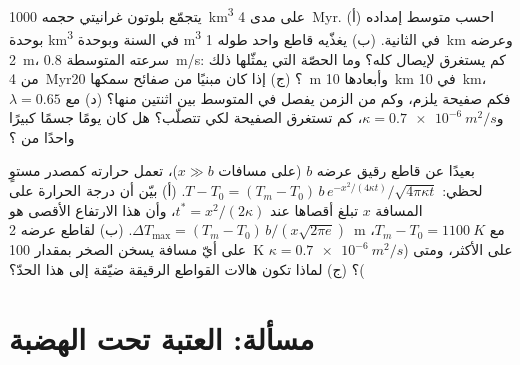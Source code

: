 \begin{exercise}[$\star\star\star$]\label{exo:b2:magma-emplacement:11}
يتجمّع بلوتون غرانيتي حجمه \qty{1000}{km^3} على مدى \qty{4}{Myr}. (أ) احسب
متوسط إمداده  بوحدة \unit{km^3} في السنة وبوحدة \unit{m^3} في الثانية. (ب)
يغذّيه قاطع واحد طوله \qty{1}{km} وعرضه \qty{2}{m}، سرعته المتوسطة
\qty{0.8}{m/s}: كم يستغرق  لإيصال 
كله؟ وما الحصّة التي يمثّلها ذلك من \qty{4}{Myr}؟ (ج) إذا كان  مبنيًا من
صفائح سمكها \qty{20}{m} وأبعادها \qty{10}{km} في \qty{10}{km}، فكم صفيحة
يلزم، وكم من الزمن يفصل في المتوسط بين اثنتين منها؟ (د) مع
$\lambda = 0.65$ و$\kappa = \qty{0.7e-6}{m^2/s}$، كم تستغرق الصفيحة لكي
تتصلّب؟ هل كان  يومًا جسمًا كبيرًا واحدًا من ؟
\end{exercise}

\begin{exercise}[$\star\star\star$]\label{exo:b2:magma-emplacement:12}
بعيدًا عن قاطع رقيق عرضه $b$ (على مسافات $x \gg b$)، تعمل حرارته كمصدر
مستوٍ لحظي: $T - T_0 = (T_m - T_0)\,b\,e^{-x^2/(4\kappa
t)}/\sqrt{4\pi\kappa t}$. (أ) بيّن أن درجة الحرارة على المسافة $x$ تبلغ أقصاها عند
$t^* = x^2/(2\kappa)$، وأن هذا الارتفاع الأقصى هو $\Delta T_{\max} = (T_m -
T_0)\,b/(x\sqrt{2\pi e})$. (ب) لقاطع عرضه \qty{2}{m} مع $T_m - T_0 =
\qty{1100}{K}$، على أيّ مسافة يسخن الصخر بمقدار \qty{100}{K} على الأكثر،
ومتى ($\kappa = \qty{0.7e-6}{m^2/s}$)؟ (ج) لماذا تكون هالات القواطع الرقيقة
ضيّقة إلى هذا الحدّ؟
\end{exercise}

\section{مسألة: العتبة تحت الهضبة}

